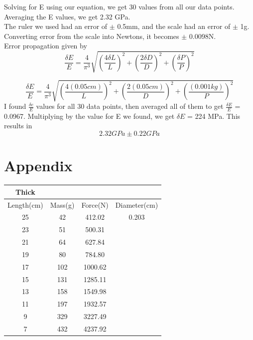 \documentclass[12pt]{article}
\newcommand\tab[1][1.5cm]{\hspace*{#1}}
\begin{document}
Solving for E using our equation, we get 30 values from all our data points. Averaging the E values, we get 2.32 GPa.\\
\tab The ruler we used had an error of $\pm$ 0.5mm, and the scale had an error of $\pm$ 1g. Converting error from the scale into Newtons, it becomes $\pm$ 0.0098N.\\
\tab Error propagation given by
$$\frac{\delta E}{E} = \frac{4}{\pi ^3}\sqrt{(\frac{4\delta L}{L})^2 + (\frac{2\delta D}{D})^2 + (\frac{\delta P}{P})^2}$$

$$\frac{\delta E}{E} = \frac{4}{\pi ^3}\sqrt{(\frac{4(0.05cm)}{L})^2 + (\frac{2(0.05cm)}{D})^2 + (\frac{(0.001kg)}{P})^2}$$
\tab I found $\frac{\delta e}{E}$ values for all 30 data points, then averaged all of them to get $\frac{\delta E}{E}$ = 0.0967. Multiplying by the value for E we found, we get $\delta E$ = 224 MPa. This results in $$2.32GPa \pm 0.22GPa$$

\section{Appendix}
\centering
\begin{tabular}{|| c | c | c | c ||}
 \hline
 Thick &\ &\ &\ \\
 \hline
 Length(cm) & Mass(g) & Force(N) & Diameter(cm) \\
 \hline
 \hline
 25 & 42 & 412.02 & 0.203 \\
 23 & 51 & 500.31 &\ \\
 21 & 64 & 627.84 &\ \\
 19 & 80 & 784.80 &\ \\
 17 & 102 & 1000.62 &\ \\
 15 & 131 & 1285.11 &\ \\
 13 & 158 & 1549.98 &\ \\
 11 & 197 & 1932.57 &\ \\
 9 & 329 & 3227.49 &\ \\
 7 & 432 & 4237.92 &\ \\
 \hline
\end{tabular}\\\ \\\ \\\ 
\end{document}

